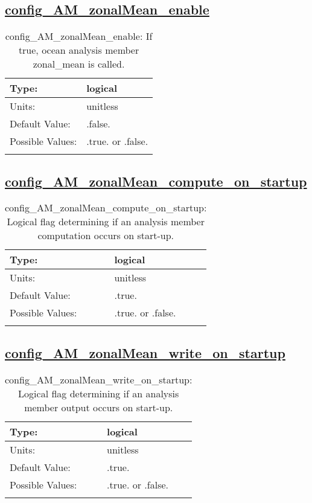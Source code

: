 \subsection[config\_AM\_zonalMean\_enable]{\hyperref[sec:nm_tab_AM_zonalMean]{config\_AM\_zonalMean\_enable}}
\label{subsec:nm_sec_config_AM_zonalMean_enable}
\begin{center}
\begin{longtable}{| p{2.0in} || p{4.0in} |}
    \hline
    Type: & logical \\
    \hline
    Units: & \si{unitless} \\
    \hline
    Default Value: & .false. \\
    \hline
    Possible Values: & .true. or .false. \\
    \hline
    \caption{config\_AM\_zonalMean\_enable: If true, ocean analysis member zonal\_mean is called.}
\end{longtable}
\end{center}
\subsection[config\_AM\_zonalMean\_compute\_on\_startup]{\hyperref[sec:nm_tab_AM_zonalMean]{config\_AM\_zonalMean\_compute\_on\_startup}}
\label{subsec:nm_sec_config_AM_zonalMean_compute_on_startup}
\begin{center}
\begin{longtable}{| p{2.0in} || p{4.0in} |}
    \hline
    Type: & logical \\
    \hline
    Units: & \si{unitless} \\
    \hline
    Default Value: & .true. \\
    \hline
    Possible Values: & .true. or .false. \\
    \hline
    \caption{config\_AM\_zonalMean\_compute\_on\_startup: Logical flag determining if an analysis member computation occurs on start-up.}
\end{longtable}
\end{center}
\subsection[config\_AM\_zonalMean\_write\_on\_startup]{\hyperref[sec:nm_tab_AM_zonalMean]{config\_AM\_zonalMean\_write\_on\_startup}}
\label{subsec:nm_sec_config_AM_zonalMean_write_on_startup}
\begin{center}
\begin{longtable}{| p{2.0in} || p{4.0in} |}
    \hline
    Type: & logical \\
    \hline
    Units: & \si{unitless} \\
    \hline
    Default Value: & .true. \\
    \hline
    Possible Values: & .true. or .false. \\
    \hline
    \caption{config\_AM\_zonalMean\_write\_on\_startup: Logical flag determining if an analysis member output occurs on start-up.}
\end{longtable}
\end{center}
